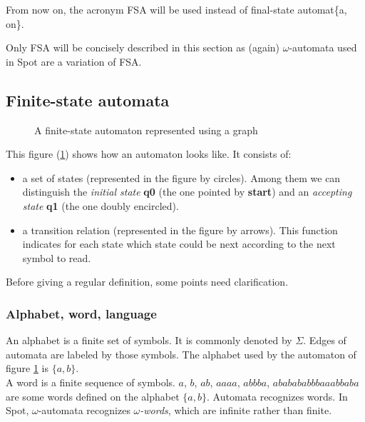 \noindent From now on, the acronym FSA will be used instead of final-state automat\{a, on\}.

Only FSA will be concisely described in this section as (again) $\omega$-automata used in Spot are a
variation of FSA.

\subsection{Finite-state automata}
\begin{figure}[h]
  \centering
  \caption{A finite-state automaton represented using a graph}
   \label{aut:pres}
\end{figure}

This figure (\ref{aut:pres}) shows how an automaton looks like. It consists of:
\begin{itemize}
 \item a set of states (represented in the figure by circles). Among them we can distinguish the 
       \textit{initial state} \textbf{q0} (the one pointed by \textbf{start}) and an
       \textit{accepting state} \textbf{q1} (the one doubly encircled).
 \item a transition relation (represented in the figure by arrows). This function indicates for each
       state which state could be next according to the next symbol to read.
\end{itemize}

Before giving a regular definition, some points need clarification.

\subsubsection{Alphabet, word, language}
An alphabet is a finite set of symbols. It is commonly denoted by $\Sigma$. Edges of automata are labeled
by those symbols. The alphabet used by the automaton of figure \ref{aut:pres} is $\{a, b\}$. \\

\noindent A word is a finite sequence of symbols. $a$, $b$, $ab$, $aaaa$, $abbba$, $ababababbbaaabbaba$ are
some words defined on the alphabet $\{a, b\}$. Automata recognizes words. In Spot, $\omega$-automata
recognizes \textit{$\omega$-words}, which are infinite rather than finite.\\

